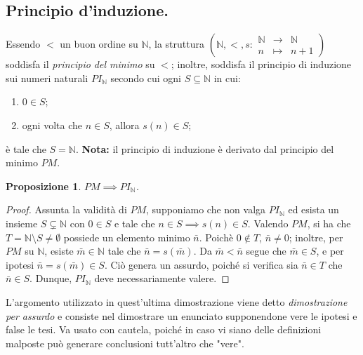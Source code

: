 \documentclass[fontsize = 11 pt, paper=A4, oneside, index=totoc, hyperref]{article}
\theoremstyle{definition}
\theoremstyle{plain}
\newtheorem{prp}{Proposizione}[section]
\newcommand{\N}{\mathbb{N}}
\begin{document}
\subsection{Principio d'induzione.}
Essendo \(<\) un buon ordine su \(\N\), la struttura \(\left(\N, <, s \colon \begin{matrix}\N & \to & \N \\ n & \mapsto & n+1\end{matrix}\right)\) soddisfa il \emph{principio del minimo} su \(<\); inoltre, soddisfa il principio di induzione sui numeri naturali \(PI_\N\) secondo cui ogni \(S \subseteq \N\) in cui:
\begin{enumerate}
  \item \(0 \in S\);
  \item ogni volta che \(n \in S\), allora \(s(n) \in S\);
\end{enumerate}
è tale che \(S = \N\). {\bf Nota:} il principio di induzione è derivato dal principio del minimo \(PM\).
\begin{prp}
  \(PM \implies PI_\N\).
\end{prp}
\begin{proof}
  Assunta la validità di \(PM\), supponiamo che non valga \(PI_\N\) ed esista un insieme \(S \subsetneq \N\) con \(0 \in S\) e tale che \(n \in S \implies s(n) \in S\). Valendo \(PM\), si ha che \(T = \N \setminus S \neq \emptyset\) possiede un elemento minimo \(\bar{n}\). Poichè \(0 \notin T\), \(\bar{n} \neq 0\); inoltre, per \(PM\) su \(\N\), esiste \(\bar{m} \in \N\) tale che \(\bar{n} = s(\bar{m})\).
  Da \(\bar{m} < \bar{n}\) segue che \(\bar{m} \in S\), e per ipotesi \(\bar{n} = s(\bar{m}) \in S\). Ciò genera un assurdo, poiché si verifica sia \(\bar{n} \in T\) che \(\bar{n} \in S\). Dunque, \(PI_\N\) deve necessariamente valere.
\end{proof}
L'argomento utilizzato in quest'ultima dimostrazione viene detto \emph{dimostrazione per assurdo} e consiste nel dimostrare un enunciato supponendone vere le ipotesi e false le tesi. Va usato con cautela, poiché in caso vi siano delle definizioni malposte può generare conclusioni tutt'altro che "vere".
\end{document}
